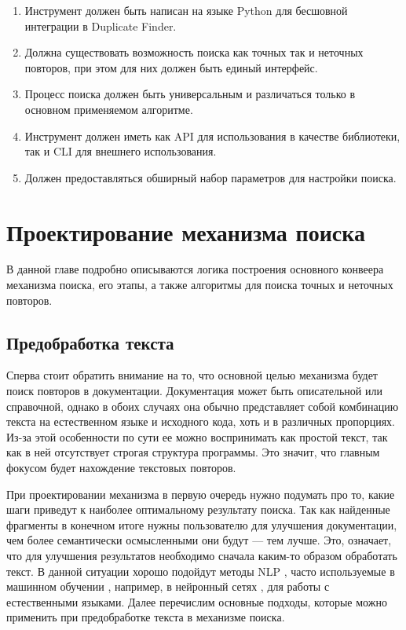 \documentclass[14pt]{matmex-diploma-custom}
\begin{document}
\begin{enumerate}
	\item Инструмент должен быть написан на языке Python для бесшовной интеграции в Duplicate Finder.
	\item Должна существовать возможность поиска как точных так и неточных повторов, при этом для них должен быть единый интерфейс.
	\item Процесс поиска должен быть универсальным и различаться только в основном применяемом алгоритме.
	\item Инструмент должен иметь как API для использования в качестве библиотеки, так и CLI для внешнего использования.
	\item Должен предоставляться обширный набор параметров для настройки поиска.
\end{enumerate}

\section{Проектирование механизма поиска}

В данной главе подробно описываются логика построения основного конвеера механизма поиска, его этапы, а также алгоритмы для поиска точных и неточных повторов.

\subsection{Предобработка текста}

Сперва стоит обратить внимание на то, что основной целью механизма будет поиск повторов в документации. Документация может быть описательной или справочной, однако в обоих случаях она обычно представляет собой комбинацию текста на естественном языке и исходного кода, хоть и в различных пропорциях. Из-за этой особенности по сути ее можно воспринимать как простой текст, так как в ней отсутствует строгая структура программы. Это значит, что главным фокусом будет нахождение текстовых повторов.

При проектировании механизма в первую очередь нужно подумать про то, какие шаги приведут к наиболее оптимальному результату поиска. Так как найденные фрагменты в конечном итоге нужны пользователю для улучшения документации, чем более семантически осмысленными они будут --- тем лучше. Это, означает, что для улучшения результатов необходимо сначала каким-то образом обработать текст. В данной ситуации хорошо подойдут методы NLP \cite{bib:art:NLP}, часто используемые в машинном обучении \cite{bib:art:Preprocessing}, например, в нейронный сетях \cite{bib:art:NeuralNetworks, bib:tool:NeuroDupDetect}, для работы с естественными языками. Далее перечислим основные подходы, которые можно применить при предобработке текста в механизме поиска.
\end{document}
